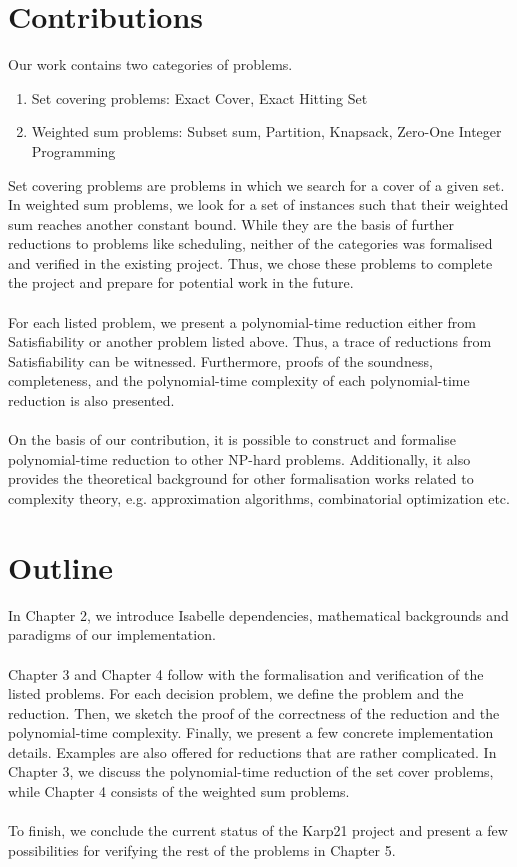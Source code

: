 \section*{Contributions}
Our work contains two categories of problems. 
\begin{enumerate}
    \item Set covering problems: Exact Cover, Exact Hitting Set
    \item Weighted sum problems: Subset sum, Partition, Knapsack, Zero-One Integer Programming
\end{enumerate}
Set covering problems are problems in which we search for a cover of a given set. In weighted sum problems, 
we look for a set of instances such that their weighted sum reaches another constant bound. While they are the basis of further reductions to problems like 
scheduling, neither of the categories was formalised and verified in the existing project. 
Thus, we chose these problems to complete the project and prepare for potential work in the future.\\\\ 
For each listed problem, we present a polynomial-time reduction either from Satisfiability or another problem listed above. 
Thus, a trace of reductions from Satisfiability can be witnessed. 
Furthermore, proofs of the soundness, completeness, 
and the polynomial-time complexity of each polynomial-time reduction is also presented. \\\\
On the basis of our contribution, it is possible to construct and formalise polynomial-time reduction to other NP-hard problems. 
Additionally, it also provides the theoretical background for other formalisation works related to complexity theory, e.g. 
approximation algorithms, combinatorial optimization etc. 

\section*{Outline}
In Chapter 2, we introduce Isabelle dependencies, mathematical backgrounds and paradigms of our implementation.\\\\
Chapter 3 and Chapter 4 follow with the formalisation and verification of the listed problems. For each decision problem, 
we define the problem and the reduction. Then, we sketch the proof of the correctness of the reduction and the polynomial-time complexity.
Finally, we present a few concrete implementation details. Examples are also offered for reductions that are rather complicated. 
In Chapter 3, we discuss the polynomial-time reduction of the set cover problems, while Chapter 4 consists of the weighted sum problems. \\\\
To finish, we conclude the current status of the Karp21 project
and present a few possibilities for verifying the rest of the problems in Chapter 5.
